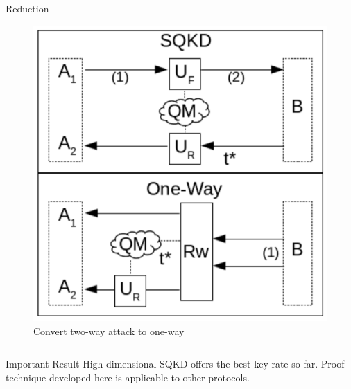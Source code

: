 \documentclass[final]{beamer}
\newlength{\onecolwid}
\newlength{\twocolwid}
\begin{document}
\begin{frame}[t]
\begin{columns}[t]
\begin{column}{\twocolwid}
\begin{columns}[t,totalwidth=\twocolwid]
\begin{column}{\onecolwid}
\begin{block}{Reduction}
\begin{figure}
	\includegraphics[width=0.8\linewidth]{oneway.png}
	\caption{Convert two-way attack to one-way}
\end{figure}


\end{block}


\end{column} %

\end{columns} %


\begin{alertblock}{Important Result}
High-dimensional SQKD offers the best key-rate so far. Proof technique developed here is applicable to other protocols.
\end{alertblock} 


\begin{columns}[t,totalwidth=\twocolwid] %


\end{columns}
\end{column}
\end{columns}
\end{frame}
\end{document}
